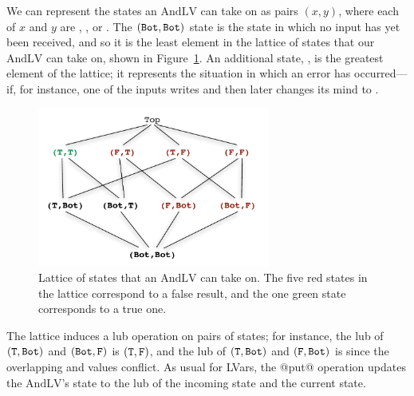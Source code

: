 We can represent the states an $\mathrm{AndLV}$ can take on as pairs
$(x, y)$, where each of $x$ and $y$ are , , or .
The $(\texttt{Bot},\texttt{Bot})$ state is the state in which no input has yet
been received, and so it is the least element in the lattice of states
that our $\mathrm{AndLV}$ can take on, shown in
Figure~\ref{f:lvars-parallel-and}.  An additional state, , is
the greatest element of the lattice; it represents the situation in
which an error has occurred---if, for instance, one of the inputs
writes  and then later changes its mind to .

\begin{figure}
\begin{center}
  \includegraphics[width=3in]{chapter2/figures/lvars-parallel-and.pdf}
\end{center}
  \caption{Lattice of states that an $\mathrm{AndLV}$ can take on.
    The five red states in the lattice correspond to a false result,
    and the one green state corresponds to a true one.}
  \label{f:lvars-parallel-and}
\end{figure}

The lattice induces a lub operation on pairs of states; for instance,
the lub of $(\texttt{T},\texttt{Bot})$ and $(\texttt{Bot},\texttt{F})$ is $(\texttt{T},\texttt{F})$,
and the lub of $(\texttt{T},\texttt{Bot})$ and $(\texttt{F},\texttt{Bot})$ is  since
the overlapping  and  values conflict.  As usual for
LVars, the @put@ operation updates the $\mathrm{AndLV}$'s state to the
lub of the incoming state and the current state.

